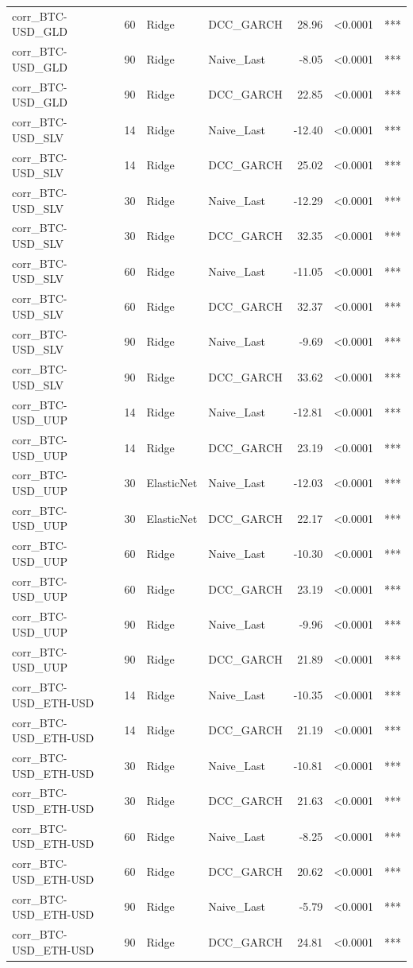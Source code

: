 \begin{table}[H]
\begin{tabular}{llllrrl}
corr_BTC-USD_GLD & 60 & Ridge & DCC_GARCH & 28.96 & <0.0001 & *** \\
corr_BTC-USD_GLD & 90 & Ridge & Naive_Last & -8.05 & <0.0001 & *** \\
corr_BTC-USD_GLD & 90 & Ridge & DCC_GARCH & 22.85 & <0.0001 & *** \\
corr_BTC-USD_SLV & 14 & Ridge & Naive_Last & -12.40 & <0.0001 & *** \\
corr_BTC-USD_SLV & 14 & Ridge & DCC_GARCH & 25.02 & <0.0001 & *** \\
corr_BTC-USD_SLV & 30 & Ridge & Naive_Last & -12.29 & <0.0001 & *** \\
corr_BTC-USD_SLV & 30 & Ridge & DCC_GARCH & 32.35 & <0.0001 & *** \\
corr_BTC-USD_SLV & 60 & Ridge & Naive_Last & -11.05 & <0.0001 & *** \\
corr_BTC-USD_SLV & 60 & Ridge & DCC_GARCH & 32.37 & <0.0001 & *** \\
corr_BTC-USD_SLV & 90 & Ridge & Naive_Last & -9.69 & <0.0001 & *** \\
corr_BTC-USD_SLV & 90 & Ridge & DCC_GARCH & 33.62 & <0.0001 & *** \\
corr_BTC-USD_UUP & 14 & Ridge & Naive_Last & -12.81 & <0.0001 & *** \\
corr_BTC-USD_UUP & 14 & Ridge & DCC_GARCH & 23.19 & <0.0001 & *** \\
corr_BTC-USD_UUP & 30 & ElasticNet & Naive_Last & -12.03 & <0.0001 & *** \\
corr_BTC-USD_UUP & 30 & ElasticNet & DCC_GARCH & 22.17 & <0.0001 & *** \\
corr_BTC-USD_UUP & 60 & Ridge & Naive_Last & -10.30 & <0.0001 & *** \\
corr_BTC-USD_UUP & 60 & Ridge & DCC_GARCH & 23.19 & <0.0001 & *** \\
corr_BTC-USD_UUP & 90 & Ridge & Naive_Last & -9.96 & <0.0001 & *** \\
corr_BTC-USD_UUP & 90 & Ridge & DCC_GARCH & 21.89 & <0.0001 & *** \\
corr_BTC-USD_ETH-USD & 14 & Ridge & Naive_Last & -10.35 & <0.0001 & *** \\
corr_BTC-USD_ETH-USD & 14 & Ridge & DCC_GARCH & 21.19 & <0.0001 & *** \\
corr_BTC-USD_ETH-USD & 30 & Ridge & Naive_Last & -10.81 & <0.0001 & *** \\
corr_BTC-USD_ETH-USD & 30 & Ridge & DCC_GARCH & 21.63 & <0.0001 & *** \\
corr_BTC-USD_ETH-USD & 60 & Ridge & Naive_Last & -8.25 & <0.0001 & *** \\
corr_BTC-USD_ETH-USD & 60 & Ridge & DCC_GARCH & 20.62 & <0.0001 & *** \\
corr_BTC-USD_ETH-USD & 90 & Ridge & Naive_Last & -5.79 & <0.0001 & *** \\
corr_BTC-USD_ETH-USD & 90 & Ridge & DCC_GARCH & 24.81 & <0.0001 & *** \\
\bottomrule
\end{tabular}
\end{table}